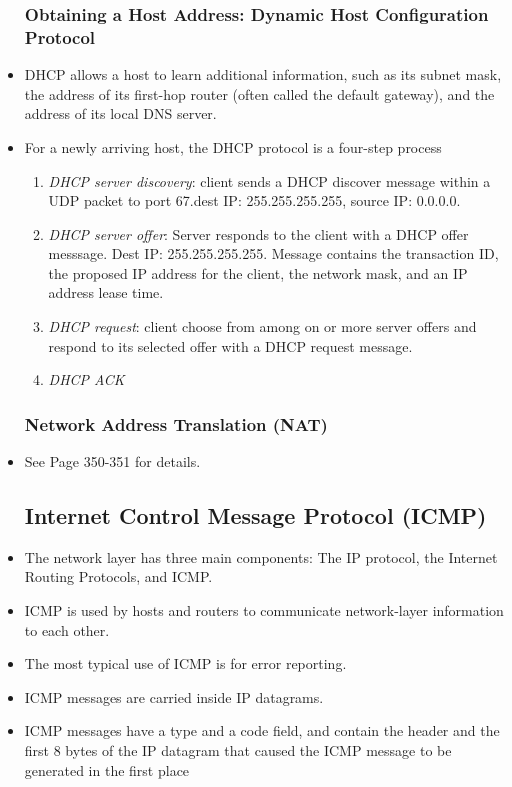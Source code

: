 \documentclass{article}
\begin{document}
\begin{itemize}
\subsubsection*{Obtaining a Host Address: Dynamic Host Configuration
  Protocol}
\item DHCP allows a host to learn additional information, such as its
  subnet mask, the address of its first-hop router (often called the
  default gateway), and the address of its local DNS server.
\item For a newly arriving host, the DHCP protocol is a four-step
  process
\begin{enumerate}
\item \emph{DHCP server discovery}: client sends a DHCP discover
  message within a UDP packet to port 67.dest IP: 255.255.255.255,
  source IP: 0.0.0.0.
\item \emph{DHCP server offer}: Server responds to the client with a
  DHCP offer messsage. Dest IP: 255.255.255.255. Message contains the
  transaction ID, the proposed IP address for the client, the network
  mask, and an IP address lease time.
\item \emph{DHCP request}: client choose from among on or more server
  offers and respond to its selected offer with a DHCP request
  message.
\item \emph{DHCP ACK}
\end{enumerate}
\subsubsection*{Network Address Translation (NAT)}
\item See Page 350-351 for details.
\subsection{Internet Control Message Protocol (ICMP)}
\item The network layer has three main components: The IP protocol,
  the Internet Routing Protocols, and ICMP.
\item ICMP is used by hosts and routers to communicate network-layer
  information to each other.
\item The most typical use of ICMP is for error reporting.
\item ICMP messages are carried inside IP datagrams.
\item ICMP messages have a type and a code field, and contain the
  header and the first 8 bytes of the IP datagram that caused the ICMP
  message to be generated in the first place

\end{itemize}
\end{document}
